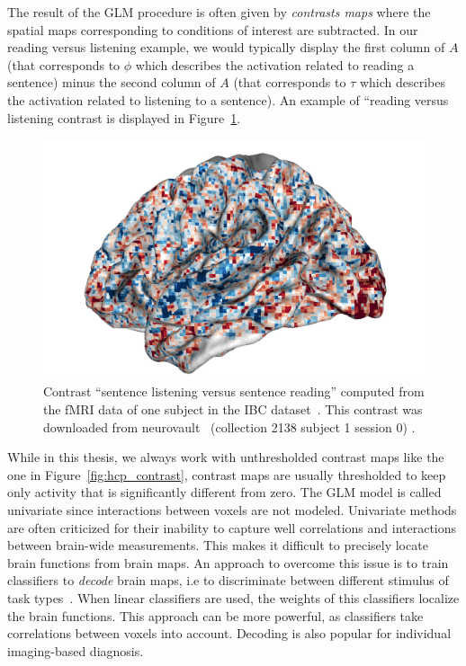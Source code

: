 The result of the GLM procedure is often given by \emph{contrasts maps} where
the spatial maps corresponding to conditions of interest are subtracted.
In our reading versus listening example, we would typically display the first column of
$A$ (that corresponds to $\phi$ which describes the activation related to
reading a sentence) minus
the second column of $A$ (that corresponds to $\tau$ which describes the
activation related to listening to a sentence). An example of ``reading versus listening contrast is displayed in
Figure~\ref{fig:ibc_contrast}.

\begin{figure}
  \includegraphics[scale=0.3]{figures/neuroscience/spatial_map.png}
  \caption{Contrast ``sentence listening versus sentence reading'' computed from the fMRI data of one
    subject in the IBC dataset~\cite{ibc, ibc2}. This contrast was downloaded
    from neurovault~\cite{gorgolewski2015neurovault} (collection 2138 subject 1 session 0) .}
  \label{fig:ibc_contrast}
\end{figure}


While in this thesis, we always work with unthresholded contrast maps like the one in Figure~\ref{fig:hcp_contrast}, contrast maps
are usually thresholded to keep only activity that is significantly
different from zero.
The GLM model is called univariate since interactions between voxels are not
modeled.
Univariate methods are often criticized for their inability to
capture well correlations and interactions between brain-wide measurements.
This makes it difficult to precisely locate brain functions from brain maps. An approach to overcome this issue is to train classifiers to \emph{decode} brain maps, i.e to discriminate between different stimulus of task
types~\cite{shirer_decoding_2012,varoquaux_how_2014,loula_decoding_2018}. When linear classifiers are used, the weights of this classifiers localize the brain functions.
This approach can be more powerful, as classifiers take correlations between
voxels into account. Decoding is also popular for individual imaging-based diagnosis.

